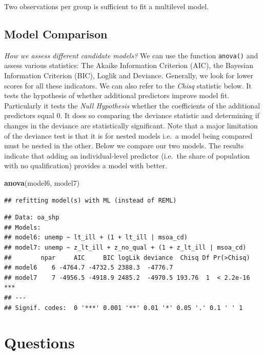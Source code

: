 \documentclass[
]{book}
\newenvironment{Shaded}{\begin{snugshade}}{\end{snugshade}}
\newcommand{\KeywordTok}[1]{\textcolor[rgb]{0.13,0.29,0.53}{\textbf{#1}}}
\newcommand{\NormalTok}[1]{#1}
\begin{document}
Two observations per group is sufficient to fit a multilevel model.

\hypertarget{model-comparison}{%
\subsection{Model Comparison}\label{model-comparison}}

\emph{How we assess different candidate models?} We can use the function \texttt{anova()} and assess various statistics: The Akaike Information Criterion (AIC), the Bayesian Information Criterion (BIC), Loglik and Deviance. Generally, we look for lower scores for all these indicators. We can also refer to the \emph{Chisq} statistic below. It tests the hypothesis of whether additional predictors improve model fit. Particularly it tests the \emph{Null Hypothesis} whether the coefficients of the additional predictors equal 0. It does so comparing the deviance statistic and determining if changes in the deviance are statistically significant. Note that a major limitation of the deviance test is that it is for nested models i.e.~a model being compared must be nested in the other. Below we compare our two models. The results indicate that adding an individual-level predictor (i.e.~the share of population with no qualification) provides a model with better.

\begin{Shaded}
\begin{Highlighting}[]
\KeywordTok{anova}\NormalTok{(model6, model7)}
\end{Highlighting}
\end{Shaded}

\begin{verbatim}
## refitting model(s) with ML (instead of REML)
\end{verbatim}

\begin{verbatim}
## Data: oa_shp
## Models:
## model6: unemp ~ lt_ill + (1 + lt_ill | msoa_cd)
## model7: unemp ~ z_lt_ill + z_no_qual + (1 + z_lt_ill | msoa_cd)
##        npar     AIC     BIC logLik deviance  Chisq Df Pr(>Chisq)    
## model6    6 -4764.7 -4732.5 2388.3  -4776.7                         
## model7    7 -4956.5 -4918.9 2485.2  -4970.5 193.76  1  < 2.2e-16 ***
## ---
## Signif. codes:  0 '***' 0.001 '**' 0.01 '*' 0.05 '.' 0.1 ' ' 1
\end{verbatim}

\hypertarget{questions-4}{%
\section{Questions}\label{questions-4}}
\end{document}
